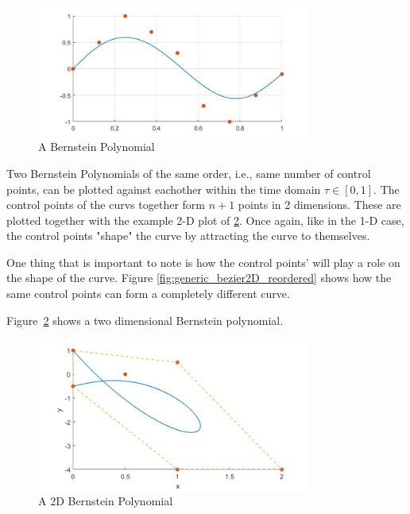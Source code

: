 \begin{figure}[h!]
\centering
\includegraphics[width=0.8\textwidth]{Images/generic_bezier.jpg}
\caption{A Bernstein Polynomial}
\label{fig:generic_bezier}
\end{figure}


\par Two Bernstein Polynomials of the same order, i.e., same number of control points, can be plotted against eachother within the time domain $\tau \in [0,1]$. The control points of the curvs together form $n+1$ points in 2 dimensions. These are plotted together with the example 2-D plot of \ref{fig:generic_bezier2D}. Once again, like in the 1-D case, the control points "shape" the curve by attracting the curve to themselves.
\par One thing that is important to note is how the control points'  will play a role on the shape of the curve. Figure \ref{fig:generic_bezier2D_reordered} shows how the same control points can form a completely different curve.

\par Figure~\ref{fig:generic_bezier2D} shows a two dimensional Bernstein polynomial.


\begin{figure}[h!]
\centering
\includegraphics[width=0.8\textwidth]{Images/generic_bezier2D.jpg}
\caption{A 2D Bernstein Polynomial}
\label{fig:generic_bezier2D}
\end{figure}

